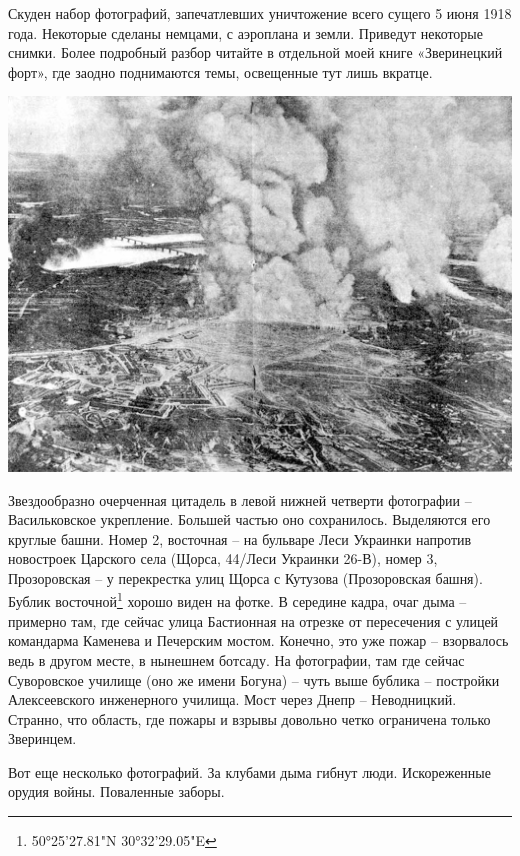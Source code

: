 Скуден набор фотографий, запечатлевших уничтожение всего сущего 5 июня 1918 года. Некоторые сделаны немцами, с аэроплана и земли. Приведут некоторые снимки. Более подробный разбор читайте в отдельной моей книге «Зверинецкий форт», где заодно поднимаются темы, освещенные тут лишь вкратце.

\newpage

\begin{center}
\includegraphics[width=\textwidth]{chast-vosp/zver/boom02.jpg}
\end{center}

Звездообразно очерченная цитадель в левой нижней четверти фотографии – Васильковское укрепление. Большей частью оно сохранилось. Выделяются его круглые башни. Номер 2, восточная – на бульваре Леси Украинки напротив новостроек Царского села (Щорса, 44/Леси Украинки 26-В), номер 3, Прозоровская – у перекрестка улиц Щорса с Кутузова (Прозоровская башня). Бублик восточной\footnote{50°25'27.81"N 30°32'29.05"E} хорошо виден на фотке. В середине кадра, очаг дыма – примерно там, где сейчас улица Бастионная на отрезке от пересечения с улицей командарма Каменева и Печерским мостом. Конечно, это уже пожар – взорвалось ведь в другом месте, в нынешнем ботсаду. На фотографии, там где сейчас Суворовское училище (оно же имени Богуна) – чуть выше бублика – постройки Алексеевского инженерного училища. Мост через Днепр – Неводницкий. Странно, что область, где пожары и взрывы довольно четко ограничена только Зверинцем.

Вот еще несколько фотографий. За клубами дыма гибнут люди. Искореженные орудия войны. Поваленные заборы.

